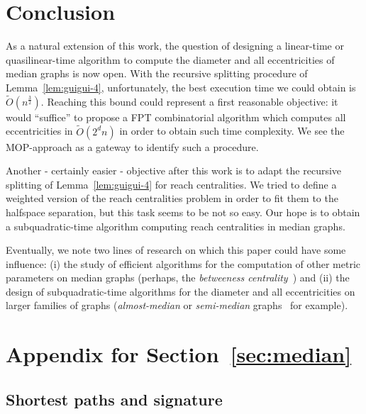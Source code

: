 \documentclass[a4paper,UKenglish,numberwithinsect,cleveref, autoref,anonymous]{lipics-v2021}
\begin{document}
\section{Conclusion} \label{sec:conclusion}

As a natural extension of this work, the question of designing a linear-time or quasilinear-time algorithm to compute
the diameter and all eccentricities of median graphs is now open. With the recursive splitting procedure of Lemma~\ref{lem:guigui-4}, unfortunately, the best execution time we could obtain is $\tilde{O}(n^{\frac{3}{2}})$. Reaching this bound could represent a first reasonable objective: it would ``suffice'' to propose a FPT combinatorial algorithm which computes all eccentricities in $\tilde{O}(2^dn)$ in order to obtain such time complexity. We see the MOP-approach as a gateway to identify such a procedure.

Another - certainly easier - objective after this work is to adapt the recursive splitting of Lemma~\ref{lem:guigui-4} for reach centralities. We tried to define a weighted version of the reach centralities problem in order to fit them to the halfspace separation, but this task seems to be not so easy. Our hope is to obtain a subquadratic-time algorithm computing reach centralities in median graphs. 

Eventually, we note two lines of research on which this paper could have some influence: (i) the study of efficient algorithms for the computation of other metric parameters on median graphs (perhaps, the \textit{betweeness centrality}~\cite{AbGrWi15}) and (ii) the design of subquadratic-time algorithms for the diameter and all eccentricities on larger families of graphs (\textit{almost-median} or \textit{semi-median} graphs~\cite{Br07,KlSh12} for example).

\newpage



\newpage

\appendix

\section{Appendix for Section~\ref{sec:median}} \label{asec:median}

\subsection{Shortest paths and signature} \label{asubsec:signature}
\end{document}
